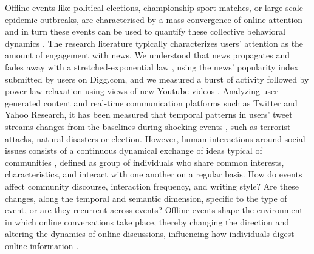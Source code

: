 \documentclass[fleqn,10pt]{wlscirep}
\begin{document}
Offline events like political elections, championship sport matches, or large-scale epidemic outbreaks, are characterised by a mass convergence of online attention and in turn these events can be used to quantify these collective behavioral dynamics \cite{szell_contraction_2014,lorenz2022systematic}.
The research literature typically characterizes users' attention as the amount of engagement with news.
We understood that news propagates and fades away with a stretched-exponential law \cite{wu2007novelty}, using the news' popularity index submitted by users on Digg.com, and we measured a burst of activity followed by power-law relaxation using views of new Youtube videos \cite{crane2008robust,yang2011patterns}. 
Analyzing user-generated content and real-time communication platforms such as Twitter and Yahoo Research,
it has been measured that temporal patterns in users' tweet streams changes from the baselines during shocking events \cite{sasahara2013quantifying,he2017measuring},
such as terrorist attacks, natural disasters or election.
However, human interactions around social issues consists of a continuous dynamical exchange of ideas typical of communities \cite{candia2019universal}, defined as  group of individuals who share common interests, characteristics, and interact with one another on a regular basis.
How do events affect community discourse, interaction frequency, and writing style?
Are these changes, along the temporal and semantic dimension, specific to the type of event, or are they recurrent across events?
Offline events shape the environment in which online conversations take place, thereby changing the direction and altering the dynamics of online discussions, influencing how individuals digest online information \cite{lorenz2022systematic}.
\end{document}
